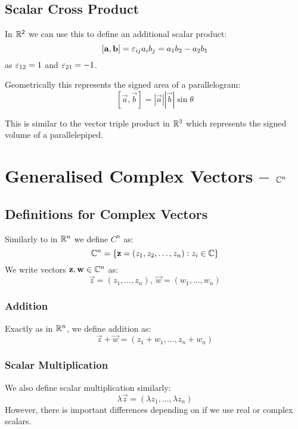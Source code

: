 \documentclass[../main.tex]{subfiles}
\begin{document}
\subsection{Scalar Cross Product}
\label{scalarCrossProduct}
In $\mathbb{R}^{2}$ we can use this to define an additional scalar product:
\[
  [\boldsymbol{\mathbf{a}}, \boldsymbol{\mathbf{b}}] = \varepsilon_{i j}a_i b_j = a_1 b_2 - a_2 b_1
\]
as $\varepsilon_{1 2} = 1$ and $\varepsilon_{2 1} = -1$.

Geometrically this represents the signed area of a parallelogram:
\[
  [\vec{a}, \vec{b}] = |\vec{a}||\vec{b}|\sin\theta
\]
\begin{center}
\end{center}
This is similar to the vector triple product in  $\mathbb{R}^{3}$ which represents the signed volume of a parallelepiped.
\section{Generalised Complex Vectors\texorpdfstring{ -- $\mathbb{C}^{n}$}{}}
\subsection{Definitions for Complex Vectors}
Similarly to in $\mathbb{R}^{n}$ we define $C^{n}$ as:
\[
  \mathbb{C}^{n} = \{\boldsymbol{\mathbf{z}} = (z_1, z_2, \ldots, z_n): z_i \in \mathbb{C}\}
\]
We write vectors $\boldsymbol{\mathbf{z}}, \boldsymbol{\mathbf{w}} \in \mathbb{C}^{n}$ as:
\[
  \vec{z} = (z_1, \ldots, z_n),\ \vec{w} = (w_1, \ldots, w_n)
\]
\subsubsection{Addition}
Exactly as in $\mathbb{R}^{n}$, we define addition as:
\[
  \vec{z} + \vec{w} = (z_1 + w_1, \ldots, z_n + w_n)
\]
\subsubsection{Scalar Multiplication}
We also define scalar multiplication similarly:
\[
  \lambda \vec{z} = (\lambda z_1, \ldots, \lambda z_n)
\]
However, there is important differences depending on if we use real or complex scalars.
\end{document}
